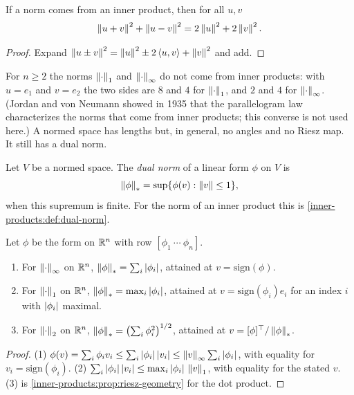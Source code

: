 \begin{notechapter}
\begin{proposition}\label{norms-banach:prop:parallelogram}
If a norm comes from an inner product, then for all $u, v$
\[
  \left\|u + v\right\|^2 + \left\|u - v\right\|^2 = 2\left\|u\right\|^2 + 2\left\|v\right\|^2 .
\]
\end{proposition}

\begin{proof}
Expand $\left\|u\pm v\right\|^2 = \left\|u\right\|^2\pm2\left\langle u, v \right\rangle + \left\|v\right\|^2$ and add.
\end{proof}

For $n\geq2$ the norms $\left\|\cdot\right\|_1$ and $\left\|\cdot\right\|_\infty$ do not come
from inner products: with $u = e_1$ and $v = e_2$ the two sides are $8$ and
$4$ for $\left\|\cdot\right\|_1$, and $2$ and $4$ for $\left\|\cdot\right\|_\infty$. (Jordan
and von Neumann showed in 1935 that the parallelogram law characterizes
the norms that come from inner products; this converse is not used here.)
A normed space has lengths but, in general, no angles and no Riesz map.
It still has a dual norm.

\begin{definition}\label{norms-banach:def:dual-norm}
Let $V$ be a normed space. The \emph{dual norm} of a linear form $\phi$ on
$V$ is
\[
  \left\|\phi\right\|_* = \sup\{\phi(v) : \left\|v\right\|\leq1\} ,
\]
when this supremum is finite. For the norm of an inner product this is
\cref{inner-products:def:dual-norm}.
\end{definition}

\begin{proposition}
\label{norms-banach:prop:dual-norms}
Let $\phi$ be the form on $\mathbb{R}^n$ with row $[\phi_1\ \cdots\ \phi_n]$.
\begin{enumerate}[nosep]
  \item For $\left\|\cdot\right\|_\infty$ on $\mathbb{R}^n$,
        $\left\|\phi\right\|_* = \sum_i\left|\phi_i\right|$, attained at
        $v = \mathrm{sign}(\phi)$.
  \item For $\left\|\cdot\right\|_1$ on $\mathbb{R}^n$,
        $\left\|\phi\right\|_* = \max_i\left|\phi_i\right|$, attained at
        $v = \mathrm{sign}(\phi_i)e_i$ for an index $i$ with $\left|\phi_i\right|$
        maximal.
  \item For $\left\|\cdot\right\|_2$ on $\mathbb{R}^n$,
        $\left\|\phi\right\|_* = \bigl(\sum_i\phi_i^2\bigr)^{1/2}$, attained at
        $v = [\phi]^\top/\left\|\phi\right\|_*$.
\end{enumerate}
\end{proposition}

\begin{proof}
(1) $\phi(v) = \sum_i\phi_iv_i\leq\sum_i\left|\phi_i\right|\left|v_i\right|
\leq\left\|v\right\|_\infty\sum_i\left|\phi_i\right|$, with equality for
$v_i = \mathrm{sign}(\phi_i)$.
(2) $\sum_i\left|\phi_i\right|\left|v_i\right|\leq\max_i\left|\phi_i\right|\,\left\|v\right\|_1$, with
equality for the stated $v$.
(3) is \cref{inner-products:prop:riesz-geometry} for the dot product.
\end{proof}


\end{notechapter}
